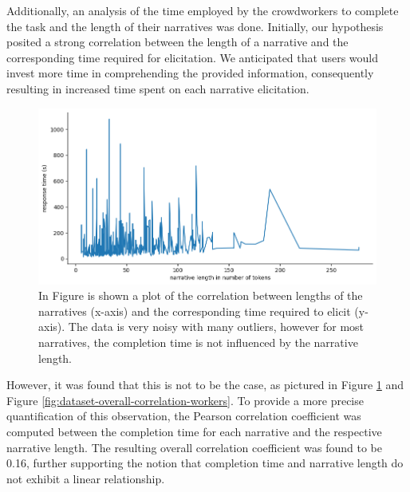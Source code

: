 Additionally, an analysis of the time employed by the crowdworkers to complete the task and the length of their narratives was done. Initially, our hypothesis posited a strong correlation between the length of a narrative and the corresponding time required for elicitation. We anticipated that users would invest more time in comprehending the provided information, consequently resulting in increased time spent on each narrative elicitation.
\begin{figure}[!htbp]
    \centering
    \includegraphics[width=1\linewidth]{assets//imgs/dataset-pearson-correlation.png}
    \caption{In Figure is shown a plot of the correlation between lengths of the narratives (x-axis) and the corresponding time required to elicit (y-axis). The data is very noisy with many outliers, however for most narratives, the completion time is not influenced by the narrative length.}
    \label{fig:dataset-pearson-correlation}
\end{figure}
However, it was found that this is not to be the case, as pictured in Figure \ref{fig:dataset-pearson-correlation} and Figure \ref{fig:dataset-overall-correlation-workers}. To provide a more precise quantification of this observation, the Pearson correlation coefficient \cite{pearson} was computed between the completion time for each narrative and the respective narrative length. The resulting overall correlation coefficient was found to be 0.16, further supporting the notion that completion time and narrative length do not exhibit a linear relationship.

